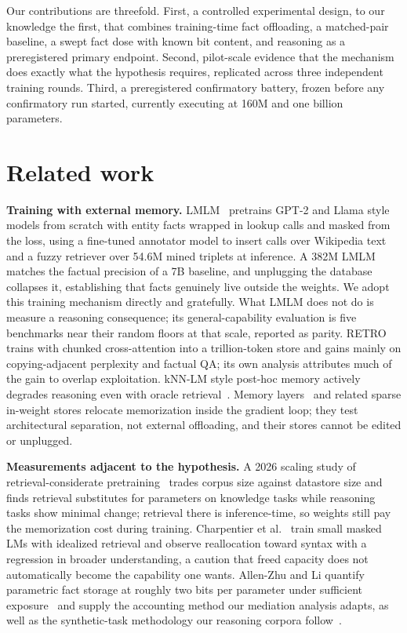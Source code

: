 \documentclass[11pt]{article}
\begin{document}
Our contributions are threefold. First, a controlled experimental design,
to our knowledge the first, that combines training-time fact offloading, a
matched-pair baseline, a swept fact dose with known bit content, and
reasoning as a preregistered primary endpoint. Second, pilot-scale
evidence that the mechanism does exactly what the hypothesis requires,
replicated across three independent training rounds. Third, a
preregistered confirmatory battery, frozen before any confirmatory run
started, currently executing at 160M and one billion parameters.

\section{Related work}

\textbf{Training with external memory.} LMLM~\cite{lmlm} pretrains GPT-2
and Llama style models from scratch with entity facts wrapped in lookup
calls and masked from the loss, using a fine-tuned annotator model to
insert calls over Wikipedia text and a fuzzy retriever over 54.6M mined
triplets at inference. A 382M LMLM matches the factual precision of a 7B
baseline, and unplugging the database collapses it, establishing that
facts genuinely live outside the weights. We adopt this training mechanism
directly and gratefully. What LMLM does not do is measure a reasoning
consequence; its general-capability evaluation is five benchmarks near
their random floors at that scale, reported as parity. RETRO~\cite{retro}
trains with chunked cross-attention into a trillion-token store and gains
mainly on copying-adjacent perplexity and factual QA; its own analysis
attributes much of the gain to overlap exploitation. kNN-LM style post-hoc
memory actively degrades reasoning even with oracle
retrieval~\cite{knnlimits}. Memory layers~\cite{memorylayers} and related
sparse in-weight stores relocate memorization inside the gradient loop;
they test architectural separation, not external offloading, and their
stores cannot be edited or unplugged.

\textbf{Measurements adjacent to the hypothesis.} A 2026 scaling study of
retrieval-considerate pretraining~\cite{memorize} trades corpus size
against datastore size and finds retrieval substitutes for parameters on
knowledge tasks while reasoning tasks show minimal change; retrieval there
is inference-time, so weights still pay the memorization cost during
training. Charpentier et al.~\cite{moreroom} train small masked LMs with
idealized retrieval and observe reallocation toward syntax with a
regression in broader understanding, a caution that freed capacity does
not automatically become the capability one wants. Allen-Zhu and Li
quantify parametric fact storage at roughly two bits per parameter under
sufficient exposure~\cite{physics33} and supply the accounting method our
mediation analysis adapts, as well as the synthetic-task methodology our
reasoning corpora follow~\cite{igsm}.
\end{document}
